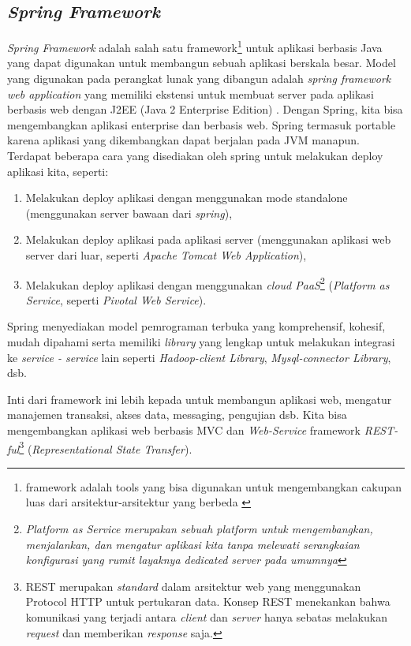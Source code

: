 \subsection{\textit{Spring Framework}}
\textit{Spring Framework} adalah salah satu framework\footnote{framework adalah tools yang bisa digunakan untuk mengembangkan cakupan luas dari arsitektur-arsitektur yang berbeda \cite{setiawan2009pemilihan}} untuk aplikasi berbasis Java yang dapat digunakan untuk membangun sebuah aplikasi berskala besar. Model yang digunakan pada perangkat lunak yang dibangun adalah \textit{spring framework web application} yang memiliki ekstensi untuk membuat server pada aplikasi berbasis web dengan J2EE (Java 2 Enterprise Edition) \cite{SpringCommerceToha:2010}. Dengan Spring, kita bisa mengembangkan aplikasi enterprise dan berbasis web. Spring termasuk portable karena aplikasi yang dikembangkan dapat berjalan pada JVM manapun. Terdapat beberapa cara yang disediakan oleh spring untuk melakukan deploy aplikasi kita, seperti: 
\begin{enumerate}
	\item Melakukan deploy aplikasi dengan menggunakan mode standalone (menggunakan server bawaan dari \textit{spring}),
	\item Melakukan deploy aplikasi pada aplikasi server (menggunakan aplikasi web server dari luar, seperti \textit{Apache Tomcat Web Application}),
	\item Melakukan deploy aplikasi dengan menggunakan \textit{cloud PaaS}\footnote{\textit{Platform as Service merupakan sebuah platform untuk mengembangkan, menjalankan, dan mengatur aplikasi kita tanpa melewati serangkaian konfigurasi yang rumit layaknya \textit{dedicated server} pada umumnya}} (\textit{Platform as Service}, seperti \textit{Pivotal Web Service}).
\end{enumerate}
Spring menyediakan model pemrograman terbuka yang komprehensif, kohesif, mudah dipahami serta memiliki \textit{library} yang lengkap untuk melakukan integrasi ke \textit{service - service} lain seperti \textit{Hadoop-client Library}, \textit{Mysql-connector Library}, dsb.

Inti dari framework ini lebih kepada untuk membangun aplikasi web, mengatur manajemen transaksi, akses data, messaging, pengujian dsb. Kita bisa mengembangkan aplikasi web berbasis MVC dan \textit{Web-Service} framework \textit{REST-ful}\footnote{REST merupakan \textit{standard} dalam arsitektur web yang menggunakan Protocol HTTP untuk pertukaran data.  Konsep REST menekankan bahwa komunikasi yang terjadi antara \textit{client} dan \textit{server} hanya sebatas melakukan \textit{request} dan memberikan \textit{response} saja.} (\textit{Representational State Transfer}).

